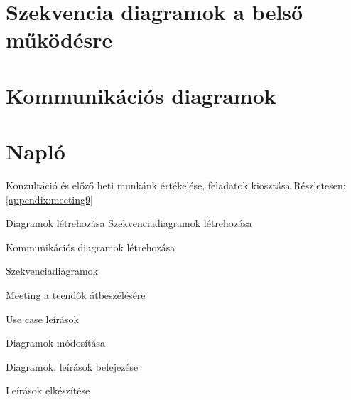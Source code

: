 \documentclass[../../projlab]{subfiles}
\begin{document}
\section{Szekvencia diagramok a belső működésre}



\section{Kommunikációs diagramok}



\section{Napló}

\begin{naplo}

	{ 
		Konzultáció és előző heti munkánk értékelése, feladatok kiosztása   
        \newline
		Részletesen: \ref{appendix:meeting9}
	}

	{ 
		Diagramok létrehozása   
	}
	{ 
		Szekvenciadiagramok létrehozása   
	}

	{ 
		Kommunikációs diagramok létrehozása   
	}

	{ 
		Szekvenciadiagramok    
	}

	{ 
		Meeting a teendők átbeszélésére  
	}

	{ 
		Use case leírások  
	}

	{ 
		Diagramok módosítása   
	}

	{ 
		Diagramok, leírások befejezése  
	}

	{ 
		Leírások elkészítése   
	}

    
\end{naplo}

\begin{toappendix}


	
\end{toappendix}
\end{document}
